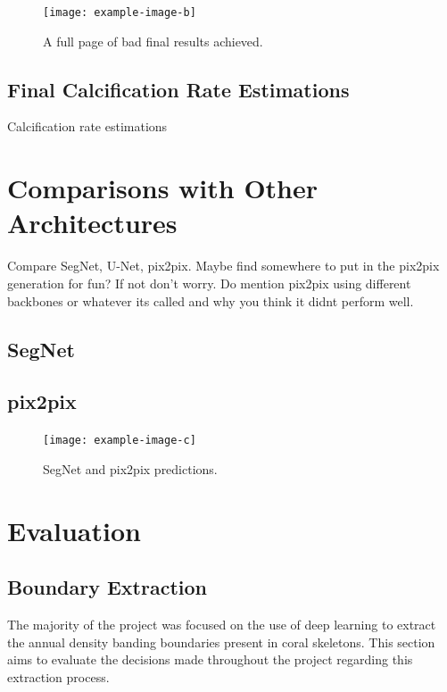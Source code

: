\begin{figure}[!p]
    \centering
    \texttt{[image: example-image-b]}
    \caption{A full page of bad final results achieved.}
    \label{fig:finalresultsbad}
\end{figure}

\subsection{Final Calcification Rate Estimations}

\begin{table}[!t]
    \centering
    \caption{Calcification rate estimations}
    
    \label{tab:calcification}
\end{table}

\section{Comparisons with Other Architectures}

Compare SegNet, U-Net, pix2pix. Maybe find somewhere to put in the pix2pix generation for fun? If not don't worry. Do mention pix2pix using different backbones or whatever its called and why you think it didnt perform well.

\subsection{SegNet}

\subsection{pix2pix}

\begin{figure}[t]
    \centering
    \texttt{[image: example-image-c]}
    \caption{SegNet and pix2pix predictions.}
\end{figure}

\section{Evaluation}

\subsection{Boundary Extraction}

The majority of the project was focused on the use of deep learning to extract the annual density banding boundaries present in coral skeletons. This section aims to evaluate the decisions made throughout the project regarding this extraction process.

